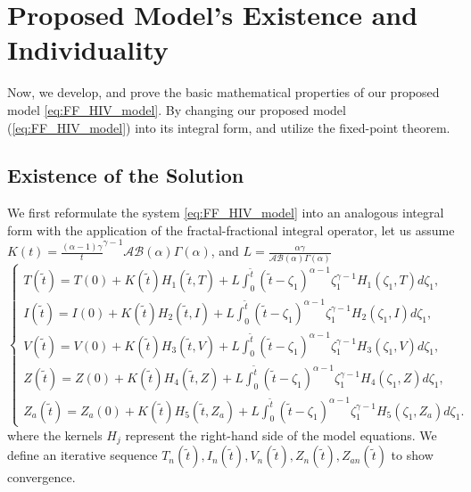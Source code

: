 \documentclass{article}
\theoremstyle{plain}
\theoremstyle{definition}
\numberwithin{equation}{section}
\begin{document}
\section{Proposed Model's Existence and Individuality}
Now, we develop, and prove the basic mathematical properties of our proposed model \eqref{eq:FF_HIV_model}. By changing our proposed model (\ref{eq:FF_HIV_model}) into its integral form, and utilize the fixed-point theorem.

\subsection{Existence of the Solution}
We first reformulate the system \eqref{eq:FF_HIV_model} into an analogous integral form with the application of the fractal-fractional integral operator, let us assume $K(t)= \frac{(\alpha-1)\gamma}t^{\gamma-1}{\mathcal{AB(\alpha)}\Gamma(\alpha)}$, and $L = \frac{\alpha\gamma}{\mathcal{AB(\alpha)}\Gamma(\alpha)}$ \\
\begin{equation}
	\label{eq:integral_system}
	\begin{cases}
		T(\tilde{t}) = T(0) + K(\tilde{t})H_1(\tilde{t}, T) + L \int_0^{\tilde{t}} (\tilde{t}-\zeta_1)^{\alpha-1} \zeta_1^{\gamma-1} H_1(\zeta_1, T) d\zeta_1, \\
		I(\tilde{t}) = I(0) + K(\tilde{t}) H_2(\tilde{t}, I) + L \int_0^{\tilde{t}} (\tilde{t}-\zeta_1)^{\alpha-1} \zeta_1^{\gamma-1} H_2(\zeta_1, I) d\zeta_1, \\
		V(\tilde{t}) = V(0) + K(\tilde{t}) H_3(\tilde{t}, V) + L \int_0^{\tilde{t}} (\tilde{t}-\zeta_1)^{\alpha-1} \zeta_1^{\gamma-1} H_3(\zeta_1, V) d\zeta_1, \\
		Z(\tilde{t}) = Z(0) + K(\tilde{t}) H_4(\tilde{t}, Z) + L \int_0^{\tilde{t}} (\tilde{t}-\zeta_1)^{\alpha-1} \zeta_1^{\gamma-1} H_4(\zeta_1, Z) d\zeta_1, \\
		Z_{a}(\tilde{t}) = Z_a(0) + K(\tilde{t}) H_5(\tilde{t}, Z_a) + L \int_0^{\tilde{t}} (\tilde{t}-\zeta_1)^{\alpha-1} \zeta_1^{\gamma-1} H_5(\zeta_1, Z_a) d\zeta_1.
	\end{cases}
\end{equation}
where the kernels $H_j$ represent the right-hand side of the model equations. We define an iterative sequence $T_n(\tilde{t}), I_n(\tilde{t}), V_n(\tilde{t}), Z_n(\tilde{t}), Z_{an}(\tilde{t})$ to show convergence.
\end{document}
